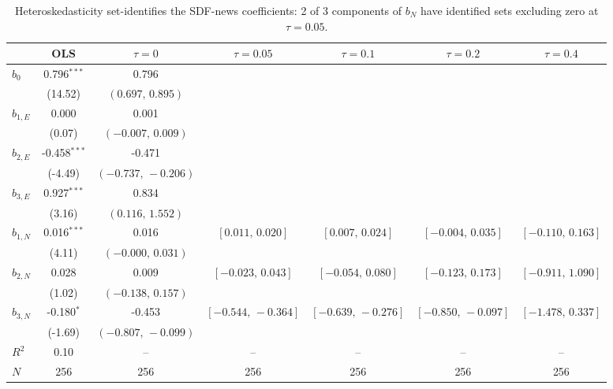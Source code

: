 \documentclass[11pt]{article}
\begin{document}
\begin{table}[!htbp]
\centering
\begin{threeparttable}
\caption{Heteroskedasticity set-identifies the SDF-news coefficients: 2 of 3 components of $b_N$ have identified sets excluding zero at $\tau{=}0.05$.}
\label{tab:structural_eq_set_id}
\footnotesize\setlength{\tabcolsep}{3pt}
\begin{tabular}{lcccccc}
\toprule
 & OLS & $\tau{=}0$ & $\tau{=}0.05$ & $\tau{=}0.1$ & $\tau{=}0.2$ & $\tau{=}0.4$ \\
\midrule
$b_0$ & 0.796$^{***}$ & 0.796 &  &  &  &  \\
 & (14.52) & $(0.697,\,0.895)$ &  &  &  &  \\
$b_{1,E}$ & 0.000 & 0.001 &  &  &  &  \\
 & (0.07) & $(-0.007,\,0.009)$ &  &  &  &  \\
$b_{2,E}$ & -0.458$^{***}$ & -0.471 &  &  &  &  \\
 & (-4.49) & $(-0.737,\,-0.206)$ &  &  &  &  \\
$b_{3,E}$ & 0.927$^{***}$ & 0.834 &  &  &  &  \\
 & (3.16) & $(0.116,\,1.552)$ &  &  &  &  \\
\midrule
$b_{1,N}$ & 0.016$^{***}$ & 0.016 & $[0.011,\,0.020]$ & $[0.007,\,0.024]$ & $[-0.004,\,0.035]$ & $[-0.110,\,0.163]$ \\
 & (4.11) & $(-0.000,\,0.031)$ &  &  &  &  \\
$b_{2,N}$ & 0.028 & 0.009 & $[-0.023,\,0.043]$ & $[-0.054,\,0.080]$ & $[-0.123,\,0.173]$ & $[-0.911,\,1.090]$ \\
 & (1.02) & $(-0.138,\,0.157)$ &  &  &  &  \\
$b_{3,N}$ & -0.180$^{*}$ & -0.453 & $[-0.544,\,-0.364]$ & $[-0.639,\,-0.276]$ & $[-0.850,\,-0.097]$ & $[-1.478,\,0.337]$ \\
 & (-1.69) & $(-0.807,\,-0.099)$ &  &  &  &  \\
\midrule
$R^2$ & 0.10 & -- & -- & -- & -- & -- \\
$N$ & 256 & 256 & 256 & 256 & 256 & 256 \\
\bottomrule
\end{tabular}
\begin{tablenotes}[flushleft]
\scriptsize

\end{tablenotes}
\end{threeparttable}
\end{table}
\end{document}
